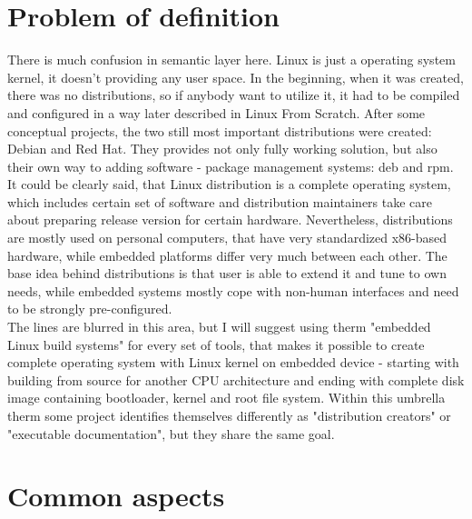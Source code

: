 \documentclass[printmode]{mgr}
\begin{document}
\section{Problem of definition}
There is much confusion in semantic layer here. Linux is just a operating system kernel, it doesn't providing any user space.
In the beginning, when it was created, there was no distributions, so if anybody want to utilize it, it had to be compiled and configured in a way later described in Linux From Scratch. After some conceptual projects, the two still most important distributions were created: Debian and Red Hat. They provides not only fully working solution, but also their own way to adding software - package management systems: deb and rpm. \\
It could be clearly said, that Linux distribution is a complete operating system, which includes certain set of software and distribution maintainers take care about preparing release version for certain hardware. Nevertheless, distributions are mostly used on personal computers, that have very standardized x86-based hardware, while embedded platforms differ very much between each other. The base idea behind distributions is that user is able to extend it and tune to own needs, while embedded systems mostly cope with non-human interfaces and need to be strongly pre-configured. \\
The lines are blurred in this area, but I will suggest using therm "embedded Linux build systems" for every set of tools, that makes it possible to create complete operating system with Linux kernel on embedded device - starting with building from source for another CPU architecture and ending with complete disk image containing bootloader, kernel and root file system. Within this umbrella therm some project identifies themselves differently as "distribution creators" or "executable documentation", but they share the same goal.

\section{Common aspects}
\end{document}
